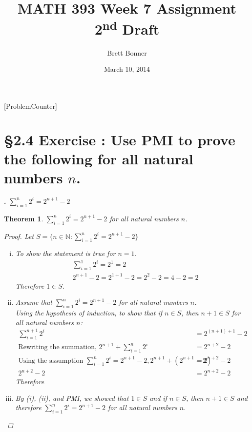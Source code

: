 \documentclass[a4paper,11pt]{article}
\begin{document}
\newtheorem*{theorem1}{Theorem}
\newtheorem*{theorem2}{Theorem}
\newtheorem*{theorem3}{Theorem}
\newtheorem*{theorem4}{Theorem}
\newtheorem*{theorem5}{Theorem}
\newtheorem*{theorem6}{Theorem}
\newtheorem*{theorem7}{Theorem}
\newtheorem*{theorem8}{Theorem}
\newtheorem*{theorem9}{True/False?}
\title{MATH 393 Week 7 Assignment 2\textsuperscript{nd} Draft}
\author{Brett Bonner}
\date{March 10, 2014}
\maketitle
\linespread{1.5}
\doublespacing
{}
[ProblemCounter]
\addtocounter{ProblemCounter}{6} %
\addtocounter{SubsectionCounter}{3} %
%

\section*{\S 2.4 Exercise : Use PMI to prove the following for all natural numbers \(n\).}
\textbf{.}
\(\sum\limits_{i=1}^n 2^i = 2^{n+1} - 2\)
\begin{theorem1}
  \(\sum\limits_{i=1}^n 2^i = 2^{n+1} - 2 \) for all natural numbers \(n\).
\begin{proof}
  Let \(S = \{n \in \mathbb{N}: \sum\limits_{i=1}^n 2^i = 2^{n+1} - 2 \}\)\\
  \begin{enumerate}[(i)]
    \item  To show the statement is true for \(n=1\).
    \begin{align*}
    &\sum\limits_{i=1}^1 2^i = 2^1 = 2\\
    &2^{n+1}-2 = 2^{1+1} -2 = 2^{2} -2 = 4 - 2 = 2
    \end{align*}
    Therefore \(1 \in S\).
    \newpage
    \item Assume that \(\sum\limits_{i=1}^n 2^i = 2^{n+1} - 2 \) for all natural numbers 
    \(n\).\\
    Using the hypothesis of induction, to show that if \(n \in S\), then \(n+1 \in S\) for all natural numbers \(n\):
    \begin{align*}
      \sum\limits_{i=1}^{n+1} 2^i &= 2^{{(n+1)}+1} - 2\\
      \text{Rewriting the summation, }2^{n+1} + \sum\limits_{i=1}^{n} 2^i &=2^{n+2} - 2\\
      \text{Using the assumption }\sum\limits_{i=1}^n 2^i = 2^{n+1} - 2, 2^{n+1} + {(2^{n+1} -2)} &= 2^{n+2} - 2\\
      2^{n+2} - 2 &= 2^{n+2} - 2
    \end{align*}
    Therefore 
    \item By (i), (ii), and PMI, we showed that \(1 \in S\) and if \(n \in S\), then \(n+1 \in S\) 
    and therefore \(\sum\limits_{i=1}^n 2^i = 2^{n+1} - 2 \) for all natural numbers \(n\).
  \end{enumerate}
\end{proof}  
\end{theorem1}
\newpage
\end{document}
